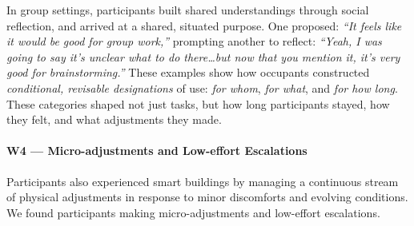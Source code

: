 In group settings, participants built shared understandings through social reflection, and arrived at a shared, situated purpose. One proposed: \textit{``It feels like it would be good for group work,''} prompting another to reflect: \textit{``Yeah, I was going to say it's unclear what to do there\ldots but now that you mention it, it’s very good for brainstorming.''} These examples show how occupants constructed \textit{conditional, revisable designations} of use: \textit{for whom}, \textit{for what}, and \textit{for how long}. These categories shaped not just tasks, but how long participants stayed, how they felt, and what adjustments they made.



\paragraph{W4 --- Micro-adjustments and Low-effort Escalations}
\label{theme:w4}

Participants also experienced smart buildings by managing a continuous stream of physical adjustments in response to minor discomforts and evolving conditions. We found participants making micro-adjustments and low-effort escalations.

